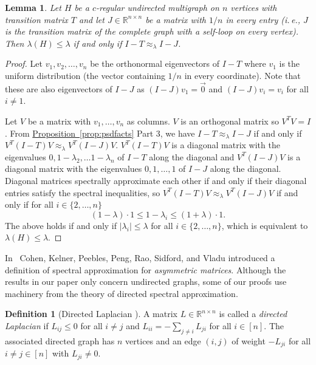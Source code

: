 \documentclass[11pt]{article}
\numberwithin{equation}{section}
\newtheorem{lemma}[theorem]{Lemma}
\theoremstyle{definition}
\newtheorem{definition}[theorem]{Definition}
\theoremstyle{plain}
\newcommand{\ie}{i.\,e.}
\newcommand{\expref}[2]{\hyperref[#2]{#1~\ref{#2}}}
\numberwithin{myalgctr}{section}
\theoremstyle{named}
\begin{document}
\begin{lemma}
\label{lem:expanderapprox}
Let $H$ be a $c$-regular undirected multigraph on $n$ vertices with transition matrix $T$ and let $J\in\mathbb{R}^{n\times n}$ be a matrix with $1/n$ in every entry (\ie, $J$ is the transition matrix of the complete graph with a self-loop  %
on every vertex). Then $\lambda(H)\leq \lambda$ if and only if $I-T\approx_{\lambda} I-J$.
\end{lemma}
\begin{proof}
Let $v_1,v_2,\ldots,v_n$ be the orthonormal eigenvectors of $I-T$ where $v_1$ is the uniform distribution (the vector containing $1/n$ in every coordinate). Note that these are also eigenvectors of $I-J$ as $(I-J)v_1=\vec{0}$ and $(I-J)v_i=v_i$ for all $i\neq 1$. 

Let $V$ be a matrix with $v_1,\ldots,v_n$ as columns. $V$ is an orthogonal matrix so $V^TV=I$. {}From \expref{Proposition}{prop:psdfacts} Part 3, we have $I-T\approx_{\lambda}I-J$ if and only if $V^T(I-T)V\approx_{\lambda}V^T(I-J)V$. $V^T(I-T)V$ is a diagonal matrix with the eigenvalues $0,1-\lambda_2,\ldots 1-\lambda_n$ of $I-T$ along the diagonal and $V^T(I-J)V$ is a diagonal matrix with the eigenvalues $0,1,\ldots, 1$ of $I-J$ along the diagonal. Diagonal matrices spectrally approximate each other if and only if their diagonal entries satisfy the spectral inequalities, so $V^T(I-T)V\approx_{\lambda}V^T(I-J)V$ if and only if for all $i\in\{2,\ldots,n\}$
\[
(1-\lambda)\cdot 1\leq 1-\lambda_i\leq (1+\lambda)\cdot 1.
\]
The above holds if and only if $|\lambda_i|\leq \lambda$ for all $i\in\{2,\ldots,n\}$, which is equivalent to $\lambda(H)\leq \lambda$. 
\end{proof}



In~\cite{CKPPRSV16} Cohen, Kelner, Peebles, Peng, Rao, Sidford, and Vladu introduced a definition of spectral approximation for \emph{asymmetric matrices}. Although the results in our paper only concern undirected graphs, some of our proofs use machinery from the theory of directed spectral approximation.  

\begin{definition}[Directed Laplacian \cite{CKPPSV16,CKPPRSV16}]
\label{def:dirlap}
A matrix $L\in\mathbb{R}^{n\times n}$ is called a \emph{directed Laplacian} if $L_{ij}\leq 0$ for all $i\neq j$ and $L_{ii}=-\sum_{j\neq i}L_{ji}$ for all $i\in[n]$. The associated directed graph has $n$ vertices and an edge $(i,j)$ of weight $-L_{ji}$ for all $i\neq j\in[n]$ with $L_{ji}\neq 0$.
\end{definition}
\end{document}
